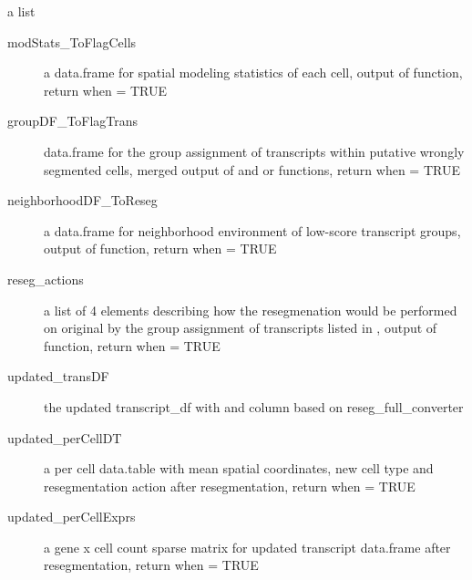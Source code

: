 \documentclass[letterpaper]{book}
\begin{document}
\begin{Value}
a list
\begin{description}

\item[modStats\_ToFlagCells] a data.frame for spatial modeling statistics of each cell, output of  function, return when  = TRUE
\item[groupDF\_ToFlagTrans] data.frame for the group assignment of transcripts within putative wrongly segmented cells, merged output of  and  or  functions, return when  = TRUE
\item[neighborhoodDF\_ToReseg] a data.frame for neighborhood environment of low-score transcript groups, output of  function, return when  = TRUE
\item[reseg\_actions] a list of 4 elements describing how the resegmenation would be performed on original  by the group assignment of transcripts listed in , output of  function, return when  = TRUE
\item[updated\_transDF] the updated transcript\_df with  and  column based on reseg\_full\_converter
\item[updated\_perCellDT] a per cell data.table with mean spatial coordinates, new cell type and resegmentation action after resegmentation, return when  = TRUE
\item[updated\_perCellExprs] a gene x cell count sparse matrix for updated transcript data.frame after resegmentation, return when  = TRUE

\end{description}

\end{Value}
%
\end{document}
